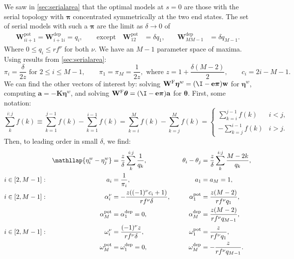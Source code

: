 \documentclass[12pt]{article}
\newcommand{\onev}{\mathbf{e}}
\newcommand{\eqm}{\pi}
\newcommand{\eq}{\boldsymbol{\eqm}}
\newcommand{\etwm}{\eta^w}
\newcommand{\etw}{\boldsymbol{\eta}^w}
\newcommand{\thbm}{\theta}
\newcommand{\thb}{\boldsymbol{\thbm}}
\newcommand{\ombm}{\omega}
\newcommand{\albm}{\alpha}
\newcommand{\wm}{w}
\newcommand{\w}{\mathbf{\wm}}
\newcommand{\Wm}{W}
\newcommand{\W}{\mathbf{\Wm}}
\newcommand{\encm}{K}
\newcommand{\enc}{\mathbf{\encm}}
\newcommand{\frg}{\W^{\mathrm{F}}}
\newcommand{\pot}{^{\text{pot}}}
\newcommand{\dep}{^{\text{dep}}}
\begin{document}
We saw in \cref{sec:serialarea} that the optimal models at \(s = 0\) are those with the serial topology with \(\eq\) concentrated symmetrically at the two end states.
The set of serial models with such a \(\eq\) are the limit as \(\delta \rightarrow 0\) of
%
\begin{equation}\label{eq:areamodels}
\begin{aligned}
  \W\pot_{ii+1} = \W\dep_{i+1i} = q_i, 
  \qquad
  \text{except} \quad
  \W\pot_{12} &= \delta q_1, \quad &
  \W\dep_{MM-1} &= \delta q_{M-1}.
\end{aligned}
\end{equation}
%
Where \(0 \leq q_i \leq rf^\nu\) for both \(\nu\).
We have an \(M-1\) parameter space of maxima.
Using results from \cref{sec:serialarea}:
%
\begin{equation*}
  \eqm_i = \frac{\delta}{2z} 
  \text{ for } 2 \leq i \leq M-1,
  \qquad
  \eqm_1 = \eqm_M = \frac{1}{2z},
  \text{ where } z = 1 + \frac{\delta (M-2)}{2},
  \qquad
  c_i = 2i - M - 1.
\end{equation*}
%
We can find the other vectors of interest by:
solving \(\frg \etw = (\I - \onev \eq) \w \) for \(\etw\),
computing \(\mathbf{a} = - \enc \etw\),
and solving \(\frg \thb = (\I - \onev \eq) \mathbf{a} \) for \(\thb\).
First, some notation:
%
\begin{equation*}
  \sum_k^{i:j} f(k) 
    \equiv \sum_{k = 1}^{j-1} f(k) - \sum_{k = 1}^{i-1} f(k)
    = \sum_{k = i}^{M} f(k) - \sum_{k = j}^{M} f(k)
    = \begin{cases}
        \sum_{k=i}^{j-1} f(k) & i < j,\\
        - \sum_{k=j}^{i-1} f(k) & i > j.
      \end{cases}
\end{equation*}
%
Then, to leading order in small \(\delta\), we find:
%
\begin{equation}\label{eq:areavecs}
\begin{aligned}
  && \mathllap
  {\etwm_i - \etwm_j} &= \frac{z}{\delta} \sum_k^{i:j} \frac{1}{q_k}, & \quad
  \thbm_i - \thbm_j &= \frac{z}{\delta} \sum_k^{i:j} \frac{M - 2k}{q_k}, \\
    i &\in [2, M-1]: &
  a_i &= \frac{1}{\eqm_i}, &
  a_1 &= a_M = 1, \\
    i &\in [2, M-1]: &
  \albm^\nu_i &= - \frac{z ((-1)^\nu c_i + 1)}{r f^\nu \delta}, &
  \albm\pot_1 &= \frac{z(M-2)}{r f^\nu q_1}, \\
  &&
  \albm\pot_M &= \albm\dep_1 = 0, &
  \albm\dep_M &= \frac{z(M-2)}{r f^\nu q_{M-1}}, \\
    i &\in [2, M-1]: &
  \ombm^\nu_i &= \frac{(-1)^\nu z}{r f^\nu \delta}, &
  \ombm\pot_1 &= \frac{z}{r f^\nu q_1}, \\
  &&
  \ombm\pot_M &= \ombm\dep_1 = 0, &
  \ombm\dep_M &= - \frac{z}{r f^\nu q_{M-1}}.
\end{aligned}
\end{equation}
\end{document}
